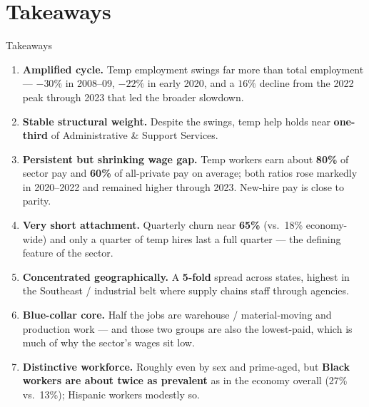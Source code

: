 \documentclass[aspectratio=169,10pt]{beamer}
\begin{document}
\section{Takeaways}
\begin{frame}{Takeaways}
  \small
  \begin{enumerate}
    \item \textbf{Amplified cycle.} Temp employment swings far more than total
          employment --- $-30\%$ in 2008--09, $-22\%$ in early 2020, and a
          $16\%$ decline from the 2022 peak through 2023 that led the broader
          slowdown.
    \item \textbf{Stable structural weight.} Despite the swings, temp help holds
          near \textbf{one-third} of Administrative \& Support Services.
    \item \textbf{Persistent but shrinking wage gap.} Temp workers earn about
          \textbf{80\%} of sector pay and \textbf{60\%} of all-private pay on
          average; both ratios rose markedly in 2020--2022 and remained higher
          through 2023. New-hire pay is close to parity.
    \item \textbf{Very short attachment.} Quarterly churn near \textbf{65\%}
          (vs.\ 18\% economy-wide) and only a quarter of temp hires last a full
          quarter --- the defining feature of the sector.
    \item \textbf{Concentrated geographically.} A \textbf{5-fold} spread across
          states, highest in the Southeast / industrial belt where supply chains
          staff through agencies.
    \item \textbf{Blue-collar core.} Half the jobs are warehouse / material-moving
          and production work --- and those two groups are also the lowest-paid,
          which is much of why the sector's wages sit low.
    \item \textbf{Distinctive workforce.} Roughly even by sex and prime-aged,
          but \textbf{Black workers are about twice as prevalent} as in the
          economy overall (27\% vs.\ 13\%); Hispanic workers modestly so.
  \end{enumerate}
\end{frame}
\end{document}
